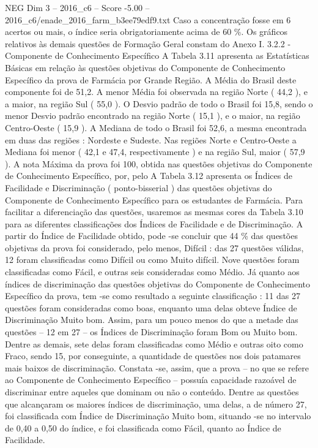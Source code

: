 \begin{textsample}{NEG Dim 3 – 2016\_c6 – Score -5.00 – 2016\_c6/enade\_2016\_farm\_b3ee79edf9.txt}
Caso a concentração fosse em 6 acertos ou mais, o índice seria obrigatoriamente acima de 60 \%.
Os gráficos relativos às demais questões de Formação Geral constam do Anexo I. 3.2.2 - Componente de Conhecimento Específico A Tabela 3.11 apresenta as Estatísticas Básicas em relação às questões objetivas do Componente de Conhecimento Específico da prova de Farmácia por Grande Região.
A Média do Brasil deste componente foi de 51,2.
A menor Média foi observada na região Norte ( 44,2 ), e a maior, na região Sul ( 55,0 ).
O Desvio padrão de todo o Brasil foi 15,8, sendo o menor Desvio padrão encontrado na região Norte ( 15,1 ), e o maior, na região Centro-Oeste ( 15,9 ).
A Mediana de todo o Brasil foi 52,6, a mesma encontrada em duas das regiões : Nordeste e Sudeste.
Nas regiões Norte e Centro-Oeste a Mediana foi menor ( 42,1 e 47,4, respectivamente ) e na região Sul, maior ( 57,9 ).
A nota Máxima da prova foi 100, obtida nas questões objetivas do Componente de Conhecimento Específico, por, pelo A Tabela 3.12 apresenta os Índices de Facilidade e Discriminação ( ponto-bisserial ) das questões objetivas do Componente de Conhecimento Específico para os estudantes de Farmácia.
Para facilitar a diferenciação das questões, usaremos as mesmas cores da Tabela 3.10 para as diferentes classificações dos Índices de Facilidade e de Discriminação.
A partir do Índice de Facilidade obtido, pode -se concluir que 44 \% das questões objetivas da prova foi considerado, pelo menos, Difícil : das 27 questões válidas, 12 foram classificadas como Difícil ou como Muito difícil.
Nove questões foram classificadas como Fácil, e outras seis consideradas como Médio.
Já quanto aos índices de discriminação das questões objetivas do Componente de Conhecimento Específico da prova, tem -se como resultado a seguinte classificação : 11 das 27 questões foram consideradas como boas, enquanto uma delas obteve Índice de Discriminação Muito bom.
Assim, para um pouco menos do que a metade das questões – 12 em 27 – os Índices de Discriminação foram Bom ou Muito bom.
Dentre as demais, sete delas foram classificadas como Médio e outras oito como Fraco, sendo 15, por conseguinte, a quantidade de questões nos dois patamares mais baixos de discriminação.
Constata -se, assim, que a prova – no que se refere ao Componente de Conhecimento Específico – possuía capacidade razoável de discriminar entre aqueles que dominam ou não o conteúdo.
Dentre as questões que alcançaram os maiores índices de discriminação, uma delas, a de número 27, foi classificada com Índice de Discriminação Muito bom, situando -se no intervalo de 0,40 a 0,50 do índice, e foi classificada como Fácil, quanto ao Índice de Facilidade.

\end{textsample}
